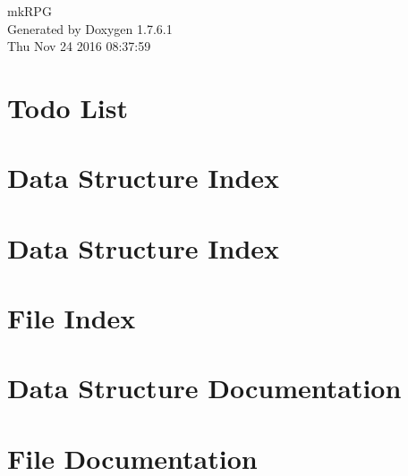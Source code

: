 \documentclass[a4paper]{book}
\begin{document}
\hypersetup{pageanchor=false,citecolor=blue}
\begin{titlepage}
\vspace*{7cm}
\begin{center}
{\Large mk\-R\-P\-G }\\
\vspace*{1cm}
{\large \-Generated by Doxygen 1.7.6.1}\\
\vspace*{0.5cm}
{\small Thu Nov 24 2016 08:37:59}\\
\end{center}
\end{titlepage}
\clearemptydoublepage
{}
\tableofcontents
\clearemptydoublepage
{}
\hypersetup{pageanchor=true,citecolor=blue}
\chapter{\-Todo \-List}
\label{todo}
\hypertarget{todo}{}

\chapter{\-Data \-Structure \-Index}

\chapter{\-Data \-Structure \-Index}

\chapter{\-File \-Index}

\chapter{\-Data \-Structure \-Documentation}













































\chapter{\-File \-Documentation}










\printindex
\end{document}
